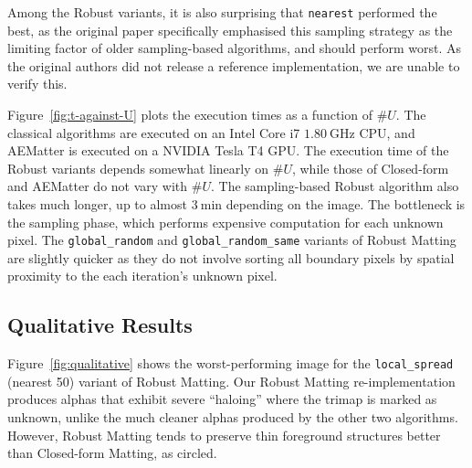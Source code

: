 \documentclass{article}
\theoremstyle{definition}
\begin{document}
\begin{multicols}{2}[]
Among the Robust variants, it is also surprising that \verb|nearest| performed the best, as the original paper specifically emphasised this sampling strategy as the limiting factor of older sampling-based algorithms, and should perform worst. As the original authors did not release a reference implementation, we are unable to verify this.

Figure~\ref{fig:t-against-U} plots the execution times as a function of $\#U$. The classical algorithms are executed on an Intel Core i7 $\SI{1.80}{\giga\hertz}$ CPU, and AEMatter is executed on a NVIDIA Tesla T4 GPU. The execution time of the Robust variants depends somewhat linearly on $\#U$, while those of Closed-form and AEMatter do not vary with $\#U$. The sampling-based Robust algorithm also takes much longer, up to almost $\SI{3}{\minute}$ depending on the image. The bottleneck is the sampling phase, which performs expensive computation for each unknown pixel. The \verb|global_random| and \verb|global_random_same| variants of Robust Matting are slightly quicker as they do not involve sorting all boundary pixels by spatial proximity to the each iteration's unknown pixel.

\subsection{Qualitative Results}
Figure~\ref{fig:qualitative} shows the worst-performing image for the \verb|local_spread| (nearest 50) variant of Robust Matting. Our Robust Matting re-implementation produces alphas that exhibit severe ``haloing'' where the trimap is marked as unknown, unlike the much cleaner alphas produced by the other two algorithms. However, Robust Matting tends to preserve thin foreground structures better than Closed-form Matting, as circled.


\end{multicols}
\end{document}
